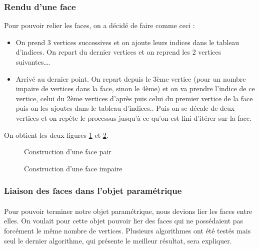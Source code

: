 \documentclass[article, backcover, french, nodocumentinfo]{upmethodology-document}
\begin{document}
	\subsubsection{Rendu d'une face}
	Pour pouvoir relier les faces, on a décidé de faire comme ceci : 
	\begin{itemize}
		\item On prend 3 vertices successives et on ajoute leurs indices dans le tableau d'indices. On repart du dernier vertices et on reprend les 2 vertices suivantes\ldots.
		\item Arrivé au dernier point. On repart depuis le 3ème vertice (pour un nombre impaire de vertices dans la face, sinon le 4ème) et on va prendre l'indice de ce vertice, celui du 2ème vertices d'après puis celui du premier vertice de la face puis on les ajoutes dans le tableau d'indices.. Puis on se décale de deux vertices et on repète le processus jusqu'à ce qu'on est fini d'itérer sur la face.
	\end{itemize}
	On obtient les deux figures \ref{fig:face_1} et \ref{fig:face_2}.
	\begin{figure}[H]
			\centering%
			\caption{Construction d'une face pair}%
			\label{fig:face_1}%
	\end{figure}
	\begin{figure}[H]
			\centering%
			\caption{Construction d'une face impaire}%
			\label{fig:face_2}%
	\end{figure}
	\subsubsection{Liaison des faces dans l'objet paramétrique}
		\paragraph{} Pour pouvoir terminer notre objet paramétrique, nous devions lier les faces entre elles. On voulait pour cette objet pouvoir lier des faces qui ne possédaient pas forcément le même nombre de vertices. Plusieurs algorithmes ont été testés mais seul le dernier algorithme, qui présente le meilleur résultat, sera expliquer.
		
\end{document}
